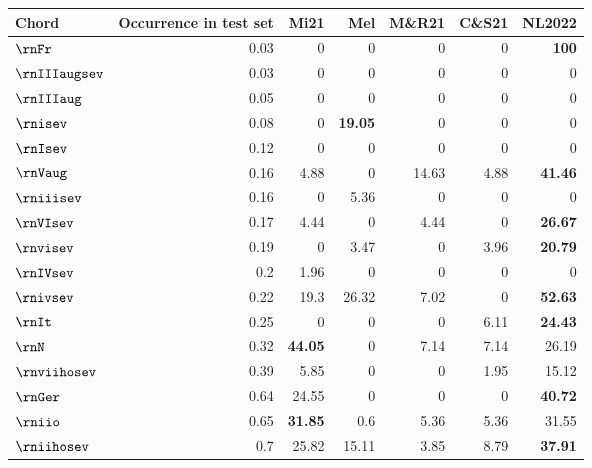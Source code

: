 \begin{tabular}{l|rrrrrr}
Chord & Occurrence in test set & Mi21           & Mel            & M\&R21 & C\&S21 & NL2022         \\ \hline
$\rnFr$   & 0.03                   & 0              & 0              & 0     & 0     & \textbf{100}   \\
$\rnIIIaugsev$ & 0.03                   & 0              & 0              & 0     & 0     & 0              \\
$\rnIIIaug$  & 0.05                   & 0              & 0              & 0     & 0     & 0              \\
$\rnisev$    & 0.08                   & 0              & \textbf{19.05} & 0     & 0     & 0              \\
$\rnIsev$    & 0.12                   & 0              & 0              & 0     & 0     & 0              \\
$\rnVaug$    & 0.16                   & 4.88           & 0              & 14.63 & 4.88  & \textbf{41.46} \\
$\rniiisev$  & 0.16                   & 0              & 5.36           & 0     & 0     & 0              \\
$\rnVIsev$   & 0.17                   & 4.44           & 0              & 4.44  & 0     & \textbf{26.67} \\
$\rnvisev$   & 0.19                   & 0              & 3.47           & 0     & 3.96  & \textbf{20.79} \\
$\rnIVsev$   & 0.2                    & 1.96           & 0              & 0     & 0     & 0              \\
$\rnivsev$   & 0.22                   & 19.3           & 26.32          & 7.02  & 0     & \textbf{52.63} \\
$\rnIt$    & 0.25                   & 0              & 0              & 0     & 6.11  & \textbf{24.43} \\
$\rnN$     & 0.32                   & \textbf{44.05} & 0              & 7.14  & 7.14  & 26.19          \\
$\rnviihosev$ & 0.39                   & 5.85           & 0              & 0     & 1.95  & 15.12          \\
$\rnGer$  & 0.64                   & 24.55          & 0              & 0     & 0     & \textbf{40.72} \\
$\rniio$   & 0.65                   & \textbf{31.85} & 0.6            & 5.36  & 5.36  & 31.55          \\
$\rniihosev$  & 0.7                    & 25.82          & 15.11          & 3.85  & 8.79  & \textbf{37.91} \\

\end{tabular}
